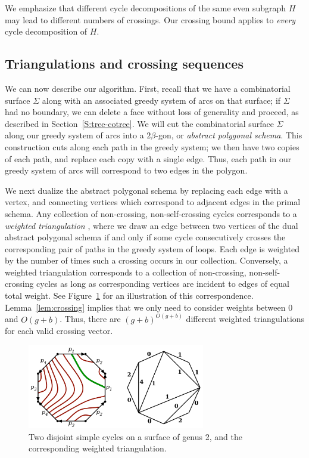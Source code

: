 \documentclass[11pt,twoside]{article}
\begin{document}
We emphasize that different cycle decompositions of the same even subgraph $H$ may lead to different numbers of crossings.  Our crossing bound applies to \emph{every} cycle decomposition of $H$.

\subsection{Triangulations and crossing sequences}
\label{SS:homotopy-triangulation}


We can now describe our algorithm.  First, recall that we have a combinatorial surface $\Sigma$ along with an associated greedy system of arcs on that surface; if  $\Sigma$ had no boundary, we can delete a face without loss of generality and proceed, as described in Section~\ref{S:tree-cotree}.
We will cut the combinatorial surface $\Sigma$ along our greedy system of arcs into a $2\beta$-gon, or \emph{abstract polygonal schema}.  This construction cuts along each path in the greedy system; we then have two copies of each path,  and replace each copy  with a single edge.  Thus, each path in our greedy system of arcs will correspond to two edges in the polygon.

We next dualize the abstract polygonal schema by replacing each edge with a vertex, and connecting vertices which correspond to adjacent edges in the primal schema.  Any collection of non-crossing, non-self-crossing cycles corresponds to a \emph{weighted triangulation} \cite{ccelw-scsih-08}, where we draw an edge between two vertices of the dual abstract polygonal schema if and only if some cycle consecutively crosses the corresponding pair of paths in the greedy system of loops.  Each edge is weighted by the number of times such a crossing occurs in our collection.  Conversely, a weighted triangulation corresponds to a collection of non-crossing, non-self-crossing cycles as long as corresponding vertices are incident to edges of equal total weight.  See Figure~\ref{fig:weightedtriangulation} for an illustration of this correspondence.  Lemma~\ref{lem:crossing} implies that we only need to consider weights between 0 and $O(g+b)$.  Thus, there are $(g+b)^{O(g+b)}$ different weighted triangulations for each valid crossing vector.


\begin{figure}[htb]
\centering\includegraphics[height=1.45in]{Fig/triangulation}
\caption{Two disjoint simple cycles on a surface of genus 2, and the corresponding weighted triangulation.}
\label{fig:weightedtriangulation}
\end{figure}
\end{document}
